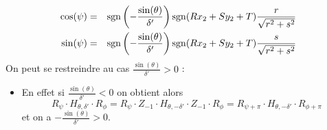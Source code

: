 \begin{prop}
 \begin{eqnarray*}
 \cos(\psi) &=& \operatorname{sgn}\left(-\frac{\sin(\theta)}{ \delta'}\right)\operatorname{sgn}(R x_2 + S y_2 +T)\frac{r}{\sqrt{r^{2}+s^{2}}}\\
 \sin(\psi) &=& \operatorname{sgn}\left(-\frac{\sin(\theta)}{ \delta'}\right)\operatorname{sgn}(R x_2 + S y_2 +T)\frac{s}{\sqrt{r^{2}+s^{2}}}
 \end{eqnarray*}
 On peut se restreindre au cas $\frac{\sin(\theta)}{\delta'}>0$ :\\
 \begin{itemize}
 \item En effet si $\frac{\sin(\theta)}{\delta'}<0$ on obtient alors
 \begin{equation*}
 R_{\psi} \cdot H_{\theta,\delta'} \cdot R_{\phi}=R_{\psi} \cdot Z_{-1}\cdot H_{\theta,-\delta'}\cdot Z_{-1} \cdot R_{\phi}= R_{\psi+\pi} \cdot H_{\theta,-\delta'}\cdot R_{\phi+\pi}
 \end{equation*}
 et on a $-\frac{\sin(\theta)}{\delta'}>0$.\\
 \end{itemize}



\end{prop}
